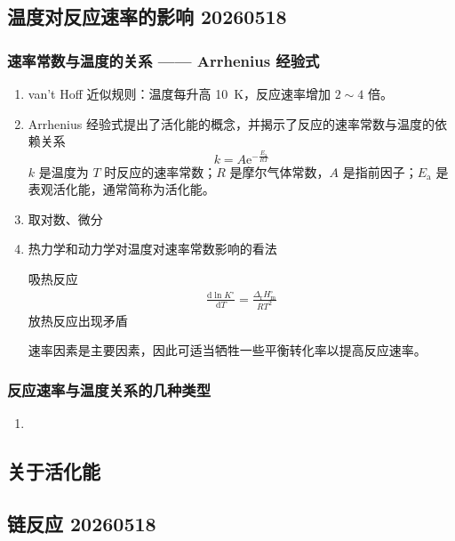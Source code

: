 \subsection{温度对反应速率的影响 20260518}

\subsubsection{速率常数与温度的关系 —— Arrhenius 经验式}

\begin{enumerate}
    \item van't Hoff 近似规则：温度每升高 \qty{10}{\kelvin}，反应速率增加 $2 \sim 4$ 倍。
    \item Arrhenius 经验式提出了活化能的概念，并揭示了反应的速率常数与温度的依赖关系
    \begin{equation}
        k = A \mathrm{e}^{-\frac{E_\mathrm{a}}{RT}}
    \end{equation}
    $k$ 是温度为 $T$ 时反应的速率常数；$R$ 是摩尔气体常数，$A$ 是指前因子；$E_{\mathrm{a}}$ 是表观活化能，通常简称为活化能。
    \item 取对数、微分
    \item 热力学和动力学对温度对速率常数影响的看法
    
    吸热反应
    \begin{equation*}
        \begin{aligned}
            \frac{\mathrm{d}\ln{K^{\circ}}}{\mathrm{d}T} = \frac{\Delta_{\mathrm{r}} H_{\mathrm{m}}^{\circ}}{RT^2}
        \end{aligned}
    \end{equation*}
    放热反应出现矛盾

    速率因素是主要因素，因此可适当牺牲一些平衡转化率以提高反应速率。
\end{enumerate}

\subsubsection{反应速率与温度关系的几种类型}

\begin{enumerate}
    \item 
\end{enumerate}

\subsection{关于活化能}

\subsection{链反应 20260518}

